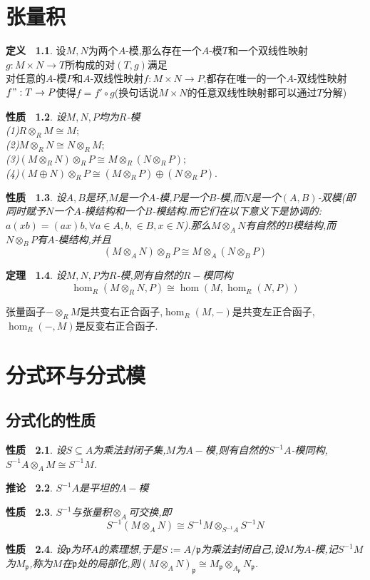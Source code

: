 \documentclass[b5paper,oneside]{ctexbook}
\newcommand{\mf}[1]{\mathfrak{#1}}
\theoremstyle{plain}
\newtheorem{thm}{定理~}[chapter]
\newtheorem{prop}[thm]{性质~}
\newtheorem{cor}[thm]{推论~}
\theoremstyle{definition}
\newtheorem{defn}[thm]{定义~}
\begin{document}
\chapter{张量积}
\begin{defn}设$M,N$为两个$A$-模,那么存在一个$A$-模$T$和一个双线性映射$g:M\times N\to T$所构成的对$(T,g)$满足\\
对任意的$A$-模$P$和$A$-双线性映射$f:M\times N\to P$,都存在唯一的一个$A$-双线性映射$f":T\to P$使得$f=f'\circ g$(换句话说$M\times N$的任意双线性映射都可以通过$T$分解)
\end{defn}
\begin{prop}设$M,N,P$均为$R$-模\\
(1)$R\otimes_{R}M\cong M;$\\
(2)$M\otimes_R N\cong N\otimes_R M;$\\
(3)$(M\otimes_RN)\otimes_RP\cong M\otimes_R(N\otimes_RP);$\\
(4)$(M\oplus N)\otimes_RP\cong (M\otimes_RP)\oplus(N\otimes_R P).$
\end{prop}
\begin{prop}设$A,B$是环,$M$是一个$A$-模,$P$是一个$B$-模,而$N$是一个$(A,B)$-双模(即同时赋予$N$一个$A$-模结构和一个$B$-模结构.而它们在以下意义下是协调的:$a(xb)=(ax)b,\forall a\in A,b,\in B,x\in N$).那么$M\otimes_A N$有自然的$B$模结构,而$N\otimes_B P$有$A$-模结构,并且
\[(M\otimes_A N)\otimes_B P\cong M\otimes_A(N\otimes_B P)\]
\end{prop}
\begin{thm}设$M,N,P$为$R$-模,则有自然的$R-$模同构
\[\hom_R(M\otimes_RN,P)\cong \hom(M,\hom_R(N,P))\]
\end{thm}
张量函子$-\otimes_RM$是共变右正合函子,$\hom_R(M,-)$是共变左正合函子,$\hom_R(-,M)$是反变右正合函子.
\chapter{分式环与分式模}
\noindent
\section{分式化的性质}
\begin{prop}设$S\subseteq A$为乘法封闭子集,$M$为$A-$模,则有自然的$S^{-1}A$-模同构,$S^{-1}A\otimes_AM\cong  S^{-1}M$.
\end{prop}
\begin{cor}
$S^{-1}A$是平坦的$A-$模
\end{cor}
\begin{prop}$S^{-1}$与张量积$\otimes_A$可交换,即
\[S^{-1}(M\otimes_AN)\cong S^{-1}M\otimes_{S^{-1}A}S^{-1}N\]
\end{prop}
\begin{prop}设$\mf{p}$为环$A$的素理想,于是$S:=A/\mf{p}$为乘法封闭自己,设$M$为$A$-模,记$S^{-1}M$为$M_{\mf{p}}$,称为$M$在$\mf{p}$处的局部化,则$(M\otimes_AN)_{\mf{p}}\cong M_{\mf{p}}\otimes_{A_{\mf{p}}}N_{\mf{p}}$.
\end{prop}
\end{document}
